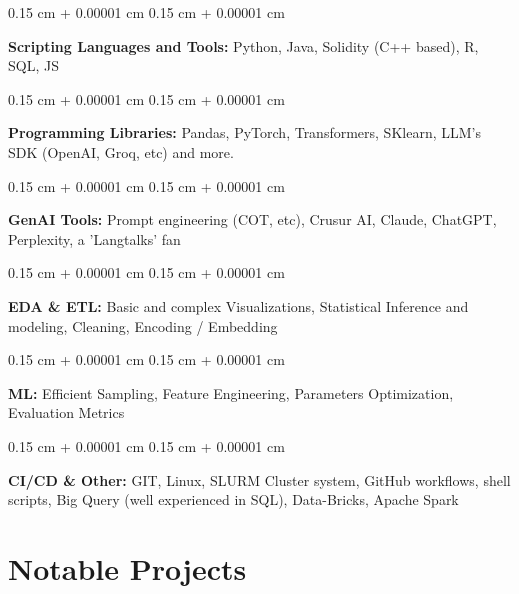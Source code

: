 \documentclass[10pt, letterpaper]{article}
\newenvironment{onecolentry}{
    \begin{adjustwidth}{
        0.15 cm + 0.00001 cm
    }{
        0.15 cm + 0.00001 cm
    }
}{
    \end{adjustwidth}
} %
\begin{document}
        
        \begin{onecolentry}
            \textbf{Scripting Languages and Tools:} Python, Java, Solidity (C++ based), R, SQL, JS
        \end{onecolentry}

        \vspace{0.15 cm}

        \begin{onecolentry}
            \textbf{Programming Libraries:} Pandas, PyTorch, Transformers, SKlearn, LLM's SDK (OpenAI, Groq, etc) and more.
        \end{onecolentry}

        \vspace{0.15 cm}

        \begin{onecolentry}
            \textbf{GenAI Tools:} Prompt engineering (COT, etc), Crusur AI, Claude, ChatGPT, Perplexity, a 'Langtalks' fan
        \end{onecolentry}

        \vspace{0.15 cm}

        \begin{onecolentry}
            \textbf{EDA \& ETL:} Basic and complex Visualizations, Statistical Inference and modeling, Cleaning, Encoding / Embedding
        \end{onecolentry}

        \vspace{0.15 cm}

        \begin{onecolentry}
            \textbf{ML:} Efficient Sampling, Feature Engineering, Parameters Optimization, Evaluation Metrics
        \end{onecolentry}

        \vspace{0.15 cm}

        \begin{onecolentry}
            \textbf{CI/CD \& Other:} GIT, Linux, SLURM Cluster system, GitHub workflows, shell scripts, Big Query (well experienced in SQL), Data-Bricks, Apache Spark
        \end{onecolentry}


    
    \section{Notable Projects}
\end{document}
